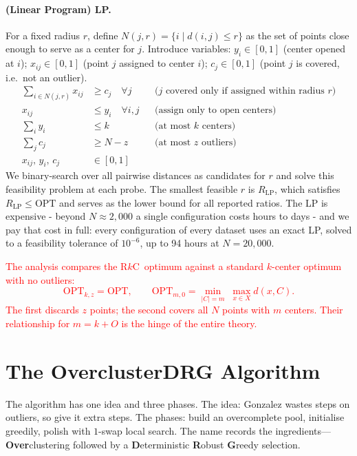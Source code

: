 \documentclass[twoside,leqno,twocolumn]{article}
\newcommand{\OPT}{\mathrm{OPT}}
\newcommand{\rkc}{R$k$C}
\begin{document}
\paragraph{(Linear Program) LP.}
For a fixed radius $r$, define $N(j,r)=\{i \mid d(i,j)\le r\}$ as the
set of points close enough to serve as a center for $j$.
Introduce variables: $y_i\in[0,1]$ (center opened at $i$);
$x_{ij}\in[0,1]$ (point $j$ assigned to center $i$);
$c_j\in[0,1]$ (point $j$ is covered, i.e.\ not an outlier).
\begin{align*}
\sum_{i\in N(j,r)} x_{ij} &\ge c_j \quad\forall j
  &&\text{($j$ covered only if assigned within radius $r$)}\\
x_{ij} &\le y_i \quad\forall i,j
  &&\text{(assign only to open centers)}\\
\sum_i y_i &\le k
  &&\text{(at most $k$ centers)}\\
\sum_j c_j &\ge N-z
  &&\text{(at most $z$ outliers)}\\
x_{ij},\,y_i,\,c_j &\in [0,1]
\end{align*}
We binary-search over all pairwise distances as candidates for $r$ and
solve this feasibility problem at each probe. The smallest feasible $r$
is $R_{\mathrm{LP}}$, which satisfies $R_{\mathrm{LP}}\le\OPT$ and
serves as the lower bound for all reported ratios.
The LP is expensive - beyond $N\approx 2{,}000$ a single configuration costs
hours to days - and we pay that cost in full: every configuration of
every dataset uses an exact LP, solved to a feasibility tolerance of
$10^{-6}$, up to 94 hours at $N=20{,}000$.

\textcolor{red}{The analysis compares the \rkc~optimum against a standard $k$-center
optimum with no outliers:
\[
  \OPT_{k,z} = \OPT, \qquad
  \OPT_{m,0} = \min_{|C|=m}\;\max_{x\in X} d(x,C).
\]
The first discards $z$ points; the second covers all $N$ points with
$m$ centers. Their relationship for $m=k+O$ is the hinge of the entire
theory.}


\section{The OverclusterDRG Algorithm}
\label{sec:algorithm}

The algorithm has one idea and three phases. The idea: Gonzalez wastes
steps on outliers, so give it extra steps. The phases: build an
overcomplete pool, initialise greedily, polish with $1$-swap local
search. The name records the ingredients---\textbf{Over}clustering
followed by a \textbf{D}eterministic \textbf{R}obust \textbf{G}reedy
selection.
\end{document}
